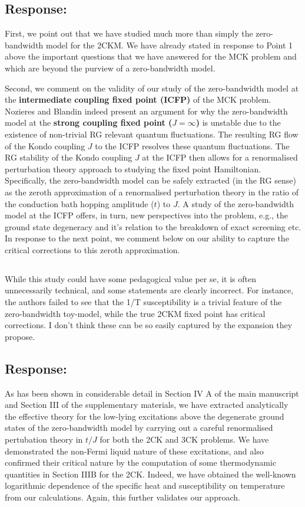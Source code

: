 \documentclass{article}
\newcommand{\response}[1]{{\color{blue}\subsection*{Response:}{#1}}}
\newcommand{\point}[1]{\subsection{}{#1}}
\begin{document}
\response{First, we point out that we have studied much more than simply the zero-bandwidth model for the 2CKM. We have already stated in response to  Point 1 above the important questions that we have answered for the MCK problem and which are beyond the purview of a zero-bandwidth model.

Second, we comment on the validity of our study of the zero-bandwidth  model at the \textbf{intermediate coupling fixed point (ICFP)} of the MCK  problem. Nozieres and Blandin indeed present an argument for why the  zero-bandwidth model at the \textbf{strong coupling fixed point ($J=\infty$)}  is unstable due to the existence of non-trivial RG relevant quantum  fluctuations. The resulting RG flow of the Kondo coupling $J$ to  the ICFP resolves these quantum fluctuations. The RG stability of the  Kondo coupling $J$ at the ICFP then allows for a renormalised perturbation  theory approach to studying the fixed point Hamiltonian. Specifically, the  zero-bandwidth model can be safely extracted (in the RG sense) as the zeroth  approximation of a renormalised perturbation theory in the ratio of  the conduction bath hopping amplitude ($t$) to $J$. A study of the  zero-bandwidth model at the ICFP offers, in turn, new perspectives  into the problem, e.g., the ground state degeneracy and it's relation  to the breakdown of exact screening etc. In response to the next point, we  comment below on our ability to capture the critical corrections to this zeroth  approximation.
}

\point{While this study could have some pedagogical value per se, it is  often unnecessarily technical, and some statements are clearly incorrect. For instance, the authors failed to see that the 1/T susceptibility is a trivial feature of the zero-bandwidth toy-model, while the true 2CKM fixed point has critical corrections. I don't think these can be so easily captured by the expansion they propose.}

\response{As has been shown in considerable detail in Section IV A of the  main manuscript and Section III of the supplementary materials, we have  extracted analytically the effective theory for the low-lying excitations  above the degenerate ground states of the zero-bandwidth model by carrying  out a careful renormalised pertubation theory in $t/J$ for both the 2CK and  3CK problems. We have demonstrated the non-Fermi liquid nature of these  excitations, and also confirmed their critical nature by the computation of  some thermodynamic quantities in Section IIIB for the 2CK. Indeed, we have  obtained the well-known logarithmic dependence of the specific heat and  susceptibility on temperature from our calculations. Again, this further  validates our approach.}
\end{document}
